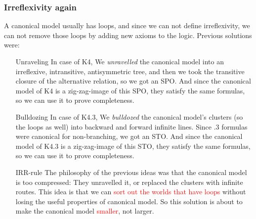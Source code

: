\documentclass[xcolor=x11names]{beamer}
\newcommand{\cemph}[1]{\textcolor{red}{#1}}
\begin{document}
\begin{frame}[t]
	\frametitle{Irreflexivity again}
\scriptsize
A canonical model usually has loops, and since we can not define irreflexivity, we can not remove those loops by adding new axioms to the logic. Previous solutions were:
\begin{itemize}
\item[Unraveling] In case of K4, We \emph{unravelled} the canonical model into an irreflexive, intransitive, antisymmetric tree, and then we took the transitive closure of the alternative relation, so we got an SPO. And since the canonical model of K4 is a zig-zag-image of this SPO, they satisfy the same formulas, so we can use it to prove completeness.
\pause
\item[Bulldozing] In case of K4.3, We \emph{bulldozed} the canonical model's clusters (so the loops as well) into backward and forward infinite lines. Since .3 formulas were canonical for non-branching, we got an STO. And since the canonical model of K4.3 is a zig-zag-image of this STO, they satisfy the same formulas, so we can use it to prove completeness.
\pause
\item[IRR-rule] The philosophy of the previous ideas was that the canonical model is too compressed: They unravelled it, or replaced the clusters with infinite routes. This idea is that we can \cemph{sort out the worlds that have loops} without losing the useful properties of canonical model. So this solution is about to make the canonical model \cemph{smaller}, not larger.
\end{itemize}


\end{frame}
\end{document}
